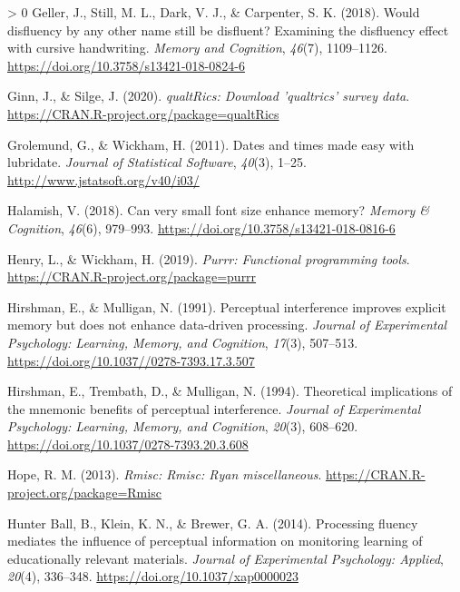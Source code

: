 \documentclass[
  english,
  jou]{apa7}
\newlength{\cslhangindent}
\newenvironment{CSLReferences}[3] %
 {%
  \setlength{\parindent}{0pt}
  \ifodd #1 \everypar{\setlength{\hangindent}{\cslhangindent}}\ignorespaces\fi
  \ifnum #2 > 0
  \setlength{\parskip}{#2\baselineskip}
  \fi
 }%
 {}
\begin{document}
\begin{CSLReferences}{1}{0}
\leavevmode\hypertarget{ref-Geller2018}{}%
Geller, J., Still, M. L., Dark, V. J., \& Carpenter, S. K. (2018). {Would disfluency by any other name still be disfluent? Examining the disfluency effect with cursive handwriting}. \emph{Memory and Cognition}, \emph{46}(7), 1109--1126. \url{https://doi.org/10.3758/s13421-018-0824-6}

\leavevmode\hypertarget{ref-R-qualtRics}{}%
Ginn, J., \& Silge, J. (2020). \emph{qualtRics: Download 'qualtrics' survey data}. \url{https://CRAN.R-project.org/package=qualtRics}

\leavevmode\hypertarget{ref-R-lubridate}{}%
Grolemund, G., \& Wickham, H. (2011). Dates and times made easy with {lubridate}. \emph{Journal of Statistical Software}, \emph{40}(3), 1--25. \url{http://www.jstatsoft.org/v40/i03/}

\leavevmode\hypertarget{ref-Halamish2018}{}%
Halamish, V. (2018). {Can very small font size enhance memory?} \emph{Memory {\&} Cognition}, \emph{46}(6), 979--993. \url{https://doi.org/10.3758/s13421-018-0816-6}

\leavevmode\hypertarget{ref-R-purrr}{}%
Henry, L., \& Wickham, H. (2019). \emph{Purrr: Functional programming tools}. \url{https://CRAN.R-project.org/package=purrr}

\leavevmode\hypertarget{ref-Hirshman1991}{}%
Hirshman, E., \& Mulligan, N. (1991). {Perceptual interference improves explicit memory but does not enhance data-driven processing.} \emph{Journal of Experimental Psychology: Learning, Memory, and Cognition}, \emph{17}(3), 507--513. \url{https://doi.org/10.1037//0278-7393.17.3.507}

\leavevmode\hypertarget{ref-Hirshman1994}{}%
Hirshman, E., Trembath, D., \& Mulligan, N. (1994). {Theoretical implications of the mnemonic benefits of perceptual interference.} \emph{Journal of Experimental Psychology: Learning, Memory, and Cognition}, \emph{20}(3), 608--620. \url{https://doi.org/10.1037/0278-7393.20.3.608}

\leavevmode\hypertarget{ref-R-Rmisc}{}%
Hope, R. M. (2013). \emph{Rmisc: Rmisc: Ryan miscellaneous}. \url{https://CRAN.R-project.org/package=Rmisc}

\leavevmode\hypertarget{ref-HunterBall2014}{}%
Hunter Ball, B., Klein, K. N., \& Brewer, G. A. (2014). {Processing fluency mediates the influence of perceptual information on monitoring learning of educationally relevant materials}. \emph{Journal of Experimental Psychology: Applied}, \emph{20}(4), 336--348. \url{https://doi.org/10.1037/xap0000023}


\end{CSLReferences}
\end{document}
